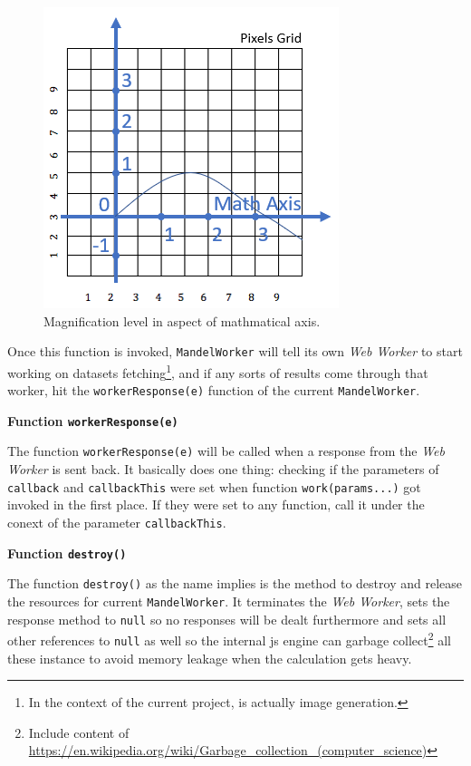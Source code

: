 \begin{figure}[th]
\centering
\includegraphics[keepaspectratio]{Figures/Chapter4/magnif.png}
\decoRule
\caption[Magnification Level]{Magnification level in aspect of mathmatical axis.}
\label{fig:magnif}
\end{figure}

Once this function is invoked, \texttt{MandelWorker} will tell its own \emph{Web Worker} to start working on datasets fetching\footnote{ In the context of the current project, is actually image generation. }, and if any sorts of results come through that worker, hit the \texttt{workerResponse(e)} function of the current \texttt{MandelWorker}.

\textbf{Function \texttt{workerResponse(e)}}

The function \texttt{workerResponse(e)} will be called when a response from the \emph{Web Worker} is sent back. It basically does one thing: checking if the parameters of \texttt{callback} and \texttt{callbackThis} were set when function \texttt{work(params...)} got invoked in the first place. If they were set to any function, call it under the conext of the parameter \texttt{callbackThis}.

\textbf{Function \texttt{destroy()}}

The function \texttt{destroy()} as the name implies is the method to destroy and release the resources for current \texttt{MandelWorker}. It terminates the \emph{Web Worker}, sets the response method to \texttt{null} so no responses will be dealt furthermore and sets all other references to \texttt{null} as well so the internal \gls{js} engine can garbage collect\footnote{Include content of \url{https://en.wikipedia.org/wiki/Garbage_collection_(computer_science)}} all these instance to avoid memory leakage when the calculation gets heavy.

